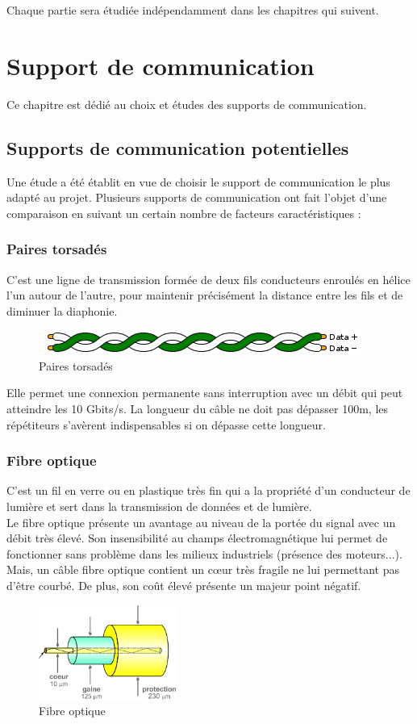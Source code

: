 \documentclass[11pt, a4paper, twoside]{book}
\begin{document}
Chaque partie sera étudiée indépendamment dans les chapitres qui suivent.

\chapter{Support de communication}
Ce chapitre est dédié au choix et études des supports de communication.
\section{Supports de communication potentielles}
Une étude a été établit en vue de choisir le support de communication le plus adapté au projet. Plusieurs supports de communication ont fait l’objet d’une comparaison en suivant un certain nombre de facteurs caractéristiques :
\subsection{Paires torsadés}
C’est une ligne de transmission formée de deux fils conducteurs enroulés en hélice l’un autour de l’autre, pour maintenir précisément la distance entre les fils et de diminuer la diaphonie.
\begin{figure}[h!]
\centering
\includegraphics[width=\textwidth]{twistedPair}
\caption{Paires torsadés}
\end{figure}
Elle permet une connexion permanente sans interruption avec un débit qui peut atteindre les 10 Gbits/s. La longueur du câble ne doit pas dépasser 100m, les répétiteurs s'avèrent indispensables si on dépasse cette longueur.
\subsection{Fibre optique}
C'est un fil en verre ou en plastique très fin qui a la propriété d'un conducteur de lumière et sert dans la transmission de données et de lumière.\\

Le fibre optique présente un avantage au niveau de la portée du signal avec un débit très élevé. Son insensibilité au champs électromagnétique lui permet de fonctionner sans problème dans les milieux industriels (présence des moteurs...). Mais, un câble fibre optique contient un cœur très fragile ne lui permettant pas d'être courbé. De plus, son coût élevé présente un majeur point négatif.
\begin{figure}[H]
\centering
\includegraphics[width=0.4\textwidth]{opticalFibre}
\caption{Fibre optique}
\end{figure}
\end{document}
